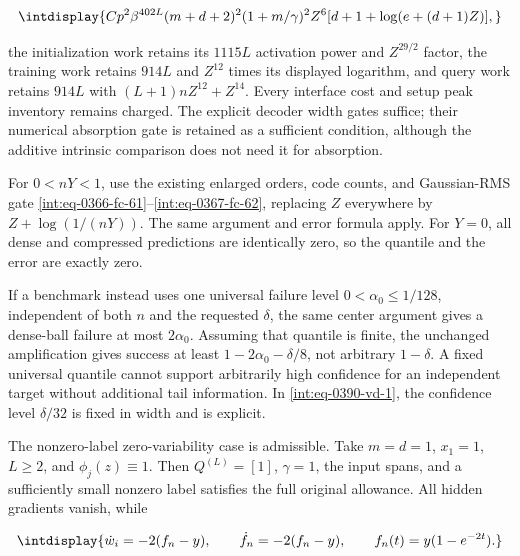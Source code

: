 \begingroup\renewcommand{\theHequation}{intdisplay.815}
\begin{equation*}
\intdisplay{
Cp^2\beta^{402L}(m+d+2)^2(1+m/\gamma)^2Z^6
[d+1+\log(e+(d+1)Z)],
}
\end{equation*}
\endgroup


the initialization work retains its \(1115L\) activation power and \(Z^{29/2}\) factor, the training work retains \(914L\) and \(Z^{12}\) times its displayed logarithm, and query work retains \(914L\) with \((L+1)nZ^{12}+Z^{14}\). Every interface cost and setup peak inventory remains charged. The explicit decoder width gates suffice; their numerical absorption gate is retained as a sufficient condition, although the additive intrinsic comparison does not need it for absorption.



For \(0<nY<1\), use the existing enlarged orders, code counts, and Gaussian-RMS gate \eqref{int:eq-0366-fc-61}--\allowbreak \eqref{int:eq-0367-fc-62}, replacing \(Z\) everywhere by \(Z+\log(1/(nY))\). The same argument and error formula apply. For \(Y=0\), all dense and compressed predictions are identically zero, so the quantile and the error are exactly zero.



If a benchmark instead uses one universal failure level \(0<\alpha_0\le1/128\), independent of both \(n\) and the requested \(\delta\), the same center argument gives a dense-ball failure at most \(2\alpha_0\). Assuming that quantile is finite, the unchanged amplification gives success at least \(1-2\alpha_0-\delta/8\), not arbitrary \(1-\delta\). A fixed universal quantile cannot support arbitrarily high confidence for an independent target without additional tail information. In \eqref{int:eq-0390-vd-1}, the confidence level \(\delta/32\) is fixed in width and is explicit.



The nonzero-label zero-variability case is admissible. Take \(m=d=1\), \(x_1=1\), \(L\ge2\), and \(\phi_j(z)\equiv1\). Then \(Q^{(L)}=[1]\), \(\gamma=1\), the input spans, and a sufficiently small nonzero label satisfies the full original allowance. All hidden gradients vanish, while


\begingroup\renewcommand{\theHequation}{intdisplay.816}
\begin{equation*}
\intdisplay{
\dot w_i=-2(f_n-y),\qquad
\dot f_n=-2(f_n-y),\qquad
f_n(t)=y(1-e^{-2t}).
}
\end{equation*}
\endgroup

